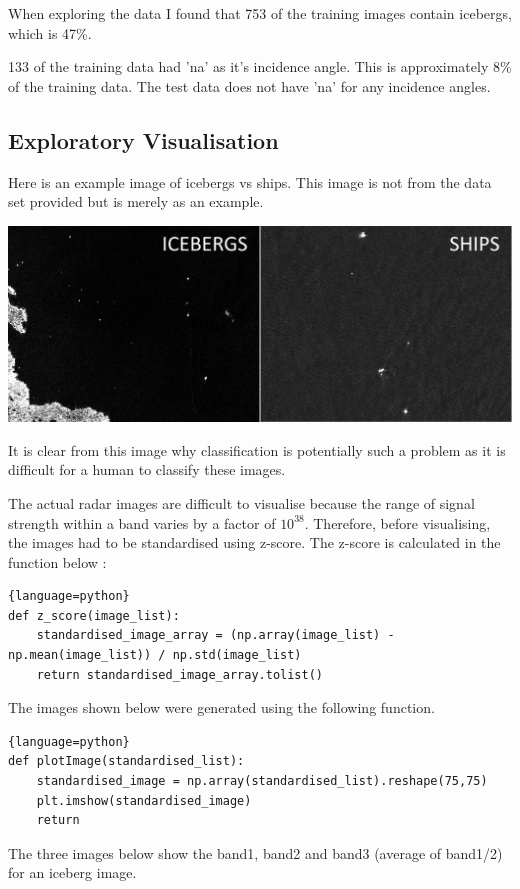 \documentclass{article}
\begin{document}
When exploring the data I found that 753 of the training images contain icebergs, which is 47\%. 

133 of the training data had 'na' as it's incidence angle. This is approximately 8\% of the training data. The test data does not have 'na' for any incidence angles.  
\subsection{Exploratory Visualisation}
Here is an example image of icebergs vs ships. This image is not from the data set provided but is merely as an example.

\includegraphics[scale=0.125]{ship-iceberg}

\cite{kaggle}
It is clear from this image why classification is potentially such a problem as it is difficult for a human to classify these images. 

The actual radar images are difficult to visualise because the range of signal strength within a band varies by a factor of $10^{38}$. Therefore, before visualising, the images had to be standardised using z-score. The z-score is calculated in the function below \cite{z-score}:
\begin{lstlisting}{language=python}
def z_score(image_list):
    standardised_image_array = (np.array(image_list) -np.mean(image_list)) / np.std(image_list)
    return standardised_image_array.tolist()
\end{lstlisting}

The images shown below were generated using the following function.
\begin{lstlisting}{language=python}
def plotImage(standardised_list):
    standardised_image = np.array(standardised_list).reshape(75,75)
    plt.imshow(standardised_image)
    return
\end{lstlisting}

The three images below show the band1, band2 and band3 (average of band1/2) for an iceberg image.
\end{document}
